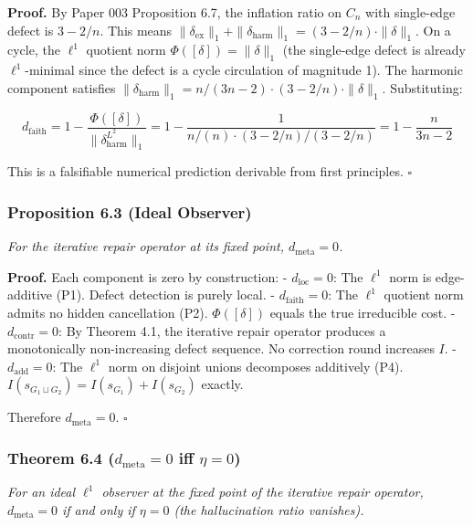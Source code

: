 \documentclass[
]{article}
\begin{document}
\textbf{Proof.} By Paper 003 Proposition 6.7, the inflation ratio on
\(C_n\) with single-edge defect is \(3 - 2/n\). This means
\(\|\delta_{\mathrm{ex}}\|_1 + \|\delta_{\mathrm{harm}}\|_1 = (3 - 2/n) \cdot \|\delta\|_1\).
On a cycle, the \(\ell^1\) quotient norm
\(\Phi([\delta]) = \|\delta\|_1\) (the single-edge defect is already
\(\ell^1\)-minimal since the defect is a cycle circulation of magnitude
1). The harmonic component satisfies
\(\|\delta_{\mathrm{harm}}\|_1 = n/(3n-2) \cdot (3 - 2/n) \cdot \|\delta\|_1\).
Substituting:

\[d_{\mathrm{faith}} = 1 - \frac{\Phi([\delta])}{\|\delta_{\mathrm{harm}}^{L^2}\|_1} = 1 - \frac{1}{n/(n) \cdot (3 - 2/n) / (3 - 2/n)} = 1 - \frac{n}{3n - 2}\]

This is a falsifiable numerical prediction derivable from first
principles. \(\square\)

\subsubsection{Proposition 6.3 (Ideal
Observer)}\label{proposition-6.3-ideal-observer}

\emph{For the iterative repair operator at its fixed point,
\(d_{\mathrm{meta}} = 0\).}

\textbf{Proof.} Each component is zero by construction: -
\(d_{\mathrm{loc}} = 0\): The \(\ell^1\) norm is edge-additive (P1).
Defect detection is purely local. - \(d_{\mathrm{faith}} = 0\): The
\(\ell^1\) quotient norm admits no hidden cancellation (P2).
\(\Phi([\delta])\) equals the true irreducible cost. -
\(d_{\mathrm{contr}} = 0\): By Theorem 4.1, the iterative repair
operator produces a monotonically non-increasing defect sequence. No
correction round increases \(I\). - \(d_{\mathrm{add}} = 0\): The
\(\ell^1\) norm on disjoint unions decomposes additively (P4).
\(I(s_{G_1 \sqcup G_2}) = I(s_{G_1}) + I(s_{G_2})\) exactly.

Therefore \(d_{\mathrm{meta}} = 0\). \(\square\)

\subsubsection{\texorpdfstring{Theorem 6.4 (\(d_{\mathrm{meta}} = 0\)
iff
\(\eta = 0\))}{Theorem 6.4 (d\_\{\textbackslash mathrm\{meta\}\} = 0 iff \textbackslash eta = 0)}}\label{theorem-6.4-d_mathrmmeta-0-iff-eta-0}

\emph{For an ideal \(\ell^1\) observer at the fixed point of the
iterative repair operator, \(d_{\mathrm{meta}} = 0\) if and only if
\(\eta = 0\) (the hallucination ratio vanishes).}
\end{document}
